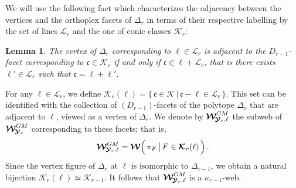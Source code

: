 \documentclass[11pt]{amsart}
\newtheorem{lem}[thm]{Lemma}
\begin{document}
We will use the following fact which characterizes the adjacency between the vertices and the orthoplex facets of $\Delta_r$ in terms of their respective labelling by the set of lines $
\boldsymbol{\mathcal L}_{r}$ and the one of conic classes $\boldsymbol{\mathcal K}_r$: 
\begin{lem}%
The vertex of $\Delta_r$ corresponding to ${\ell}\in \boldsymbol{\mathcal L}_r$ is adjacent to the $D_{r-1}$-facet corresponding to ${\mathfrak c}\in \boldsymbol{\mathcal K}_r$ if and only if ${\mathfrak c}\in{\ell}+  \boldsymbol{\mathcal L}_r$, that is there exists ${\ell}'\in  \boldsymbol{\mathcal L}_r$ such that ${\mathfrak c}={\ell}+{\ell}'$. 
\end{lem}%




For any $\ell \in \boldsymbol{\mathcal L}_r$, we define 
 $\boldsymbol{\mathcal K}_{r}(\ell)=\big\{ \, {\mathfrak c}  \in \boldsymbol{\mathcal K}\, \lvert \, 
 {\mathfrak c}-\ell \in \boldsymbol{\mathcal L}_{r}\,\big\}$. 
 This set can be identified with the collection of $(D_{r-1})$-facets of the polytope $\Delta_r$ that are adjacent to $\ell$, viewed as a vertex of $\Delta_r$.
 We denote by 
 $\boldsymbol{\mathcal W}^{GM}_{ \hspace{-0.05cm}
\boldsymbol{\mathcal Y}_r,\ell}$  the subweb of 
$\boldsymbol{\mathcal W}^{GM}_{ \hspace{-0.05cm}
\boldsymbol{\mathcal Y}_r}$
 corresponding to these facets; that is,
$$ 
\boldsymbol{\mathcal W}^{GM}_{ \hspace{-0.05cm}
\boldsymbol{\mathcal Y}_r,\ell}
=\boldsymbol{\mathcal W}\Big(\, \pi_F\, \big\lvert \,  
F \in 
\boldsymbol{\mathcal K}_{r}(\ell)\, 
\Big)\, .  
$$  Since the vertex figure of $\Delta_r$ at $\ell$ is isomorphic to $\Delta_{r-1}$, we obtain a natural bijection $\boldsymbol{\mathcal K}_r(\ell) \simeq \boldsymbol{\mathcal K}_{r-1}$. It follows that 
$ 
\boldsymbol{\mathcal W}^{GM}_{ \hspace{-0.05cm}
\boldsymbol{\mathcal Y}_r,\ell}$ is a $\kappa_{r-1}$-web.
\end{document}
